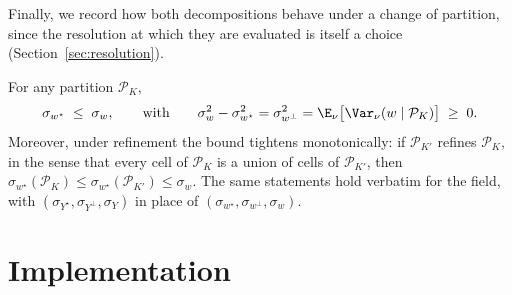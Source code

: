 Finally, we record how both decompositions behave under a change of
partition, since the resolution at which they are evaluated is itself a
choice (Section~\ref{sec:resolution}).

\begin{lemma}
\label{lem:coarsening}
For any partition $\mathcal{P}_K$,
\[
  \sigma_{w^{\star}}\;\le\;\sigma_w,
  \qquad\text{with}\qquad
  \sigma_w^2-\sigma_{w^{\star}}^2
  =\sigma_{w^{\perp}}^2
  =\E_\nu\big[\Var_\nu(w\mid\mathcal{P}_K)\big]\;\ge\;0 .
\]
Moreover, under refinement the bound tightens monotonically: if
$\mathcal{P}_{K'}$ refines $\mathcal{P}_{K}$, in the sense that every
cell of $\mathcal{P}_{K}$ is a union of cells of $\mathcal{P}_{K'}$, then
$\sigma_{w^{\star}}(\mathcal{P}_{K})\le\sigma_{w^{\star}}(\mathcal{P}_{K'})\le\sigma_w$.
The same statements hold verbatim for the field, with
$(\sigma_{Y^{\star}},\sigma_{Y^{\perp}},\sigma_Y)$ in place of
$(\sigma_{w^{\star}},\sigma_{w^{\perp}},\sigma_w)$.
\end{lemma}


\section{Implementation}
\label{sec:implementation}

